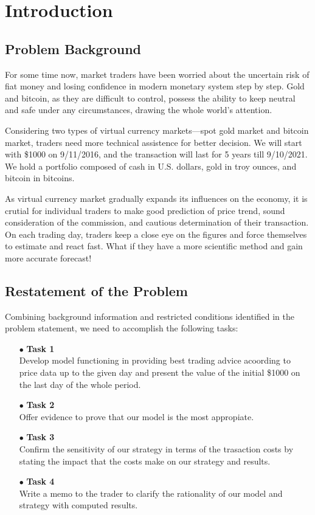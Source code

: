 \documentclass{mcmthesis}
\begin{document}

\section{Introduction}
\subsection{Problem Background}
For some time now, market traders have been worried about the uncertain risk of fiat money and losing confidence in modern monetary system step by step. Gold and bitcoin, as they are difficult to control, possess the ability to keep neutral and safe under any circumstances, drawing the whole world's attention.
\par Considering two types of virtual currency markets---spot gold market and bitcoin market, traders need more technical assistence for better decision. We will start with \$1000 on 9/11/2016, and the transaction will last for 5 years till 9/10/2021. We hold a portfolio composed of cash in U.S. dollars, gold in troy ounces, and bitcoin in bitcoins.
\par As virtual currency market gradually expands its influences on the economy, it is crutial for individual traders to make good prediction of price trend, sound consideration of the commission, and cautious determination of their transaction. On each trading day, traders keep a close eye on the figures and force themselves to estimate and react fast. What if they have a more scientific method and gain more accurate forecast!

\subsection{Restatement of the Problem}
\par Combining background information and restricted conditions identified in the problem statement, we need to accomplish  the following tasks:
\begin{enumerate}[0]
\item[$\bullet$]  \textbf{Task 1}\\
Develop model functioning in providing best trading advice acoording to price data up to the given day and present the value of the initial \$1000 on the last day of the whole period.
\item[$\bullet$]  \textbf{Task 2}\\
Offer evidence to prove that our model is the most appropiate.
\item[$\bullet$]  \textbf{Task 3}\\
Confirm the sensitivity of our strategy in terms of the trasaction costs by stating the impact that the costs make on our strategy and results.
\item[$\bullet$] \textbf{Task 4}\\
Write a memo to the trader to clarify the rationality of our model and strategy with computed results.
\end{enumerate}
\end{document}
